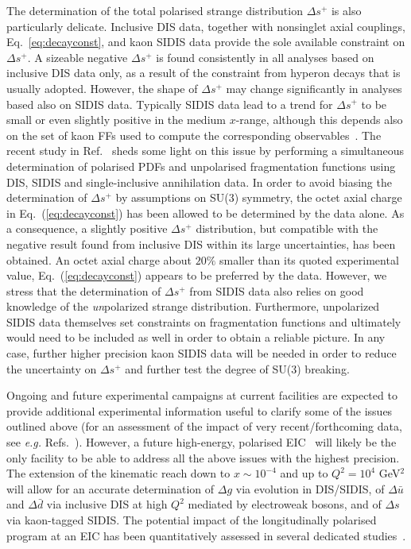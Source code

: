 The determination of the total polarised strange distribution $\Delta s^+$ is 
also particularly delicate.
%
Inclusive DIS data, together with nonsinglet axial couplings, 
Eq.~\eqref{eq:decayconst}, and kaon SIDIS data provide the sole available 
constraint on $\Delta s^+$.
%
A sizeable negative $\Delta s^+$ is found 
consistently in all analyses based on inclusive DIS data only, as a result 
of the constraint from hyperon decays that is usually adopted. 
%
However, the shape of $\Delta s^+$ may change significantly in analyses based
also on SIDIS data. Typically SIDIS data lead to a trend for $\Delta s^+$ to be
small or even slightly positive in the medium $x$-range, although this depends 
also on the set of kaon FFs used to compute
the corresponding observables~\cite{Leader:2011tm}.  
%
The recent study in Ref.~\cite{Ethier:2017zbq} sheds some light on this issue
by performing a simultaneous determination of polarised PDFs and unpolarised 
fragmentation functions using DIS, SIDIS and single-inclusive annihilation data.
%
In order to avoid biasing the determination of $\Delta s^+$ by 
assumptions on SU(3) symmetry, the octet axial charge in 
Eq.~(\ref{eq:decayconst}) has been allowed to be determined by the data alone.
%
As a consequence, a slightly positive $\Delta s^+$ distribution, but
compatible with the negative result found from inclusive DIS within its 
large uncertainties, has been obtained.
% 
An octet axial charge about $20\%$ smaller than its quoted experimental value, 
Eq.~(\ref{eq:decayconst}) appears to be preferred by the data.
%
However, we stress that the determination of $\Delta s^+$ from SIDIS data 
also relies on good knowledge of the {\it un}polarized strange distribution. 
%
Furthermore, unpolarized SIDIS data themselves set constraints on 
fragmentation functions and ultimately would need to be included as well
in order to obtain a reliable picture. 
%
In any case, further higher precision kaon SIDIS data will be needed in order 
to reduce the uncertainty on $\Delta s^+$ and further test the degree of 
SU(3) breaking. 

Ongoing and future experimental campaigns at current facilities are
expected to provide additional experimental information
useful to clarify some of the issues outlined above (for an 
assessment of the impact of very recent/forthcoming data, see {\it e.g.}
Refs.~\cite{Aschenauer:2015eha,Aschenauer:2015ata,Nocera:2015vva,
Nocera:2017wep}).
%
However, a future high-energy, polarised EIC~\cite{Accardi:2012qut} will 
likely be the only facility to be able to address all the above issues 
with the highest precision. 
% 
The extension of the kinematic reach down to $x\sim 10^{-4}$ and up to
$Q^2=10^4$ GeV$^2$ will allow for an accurate determination of $\Delta g$
via evolution in DIS/SIDIS, of $\Delta\bar{u}$ and 
$\Delta\bar{d}$ via inclusive DIS at high $Q^2$ mediated by electroweak bosons,
and of $\Delta s$ via kaon-tagged SIDIS. 
%
The potential impact of the longitudinally polarised program at an EIC
has been quantitatively assessed in several dedicated 
studies~\cite{Aschenauer:2012ve,Ball:2013tyh,Aschenauer:2013iia,
Aschenauer:2015ata}.
